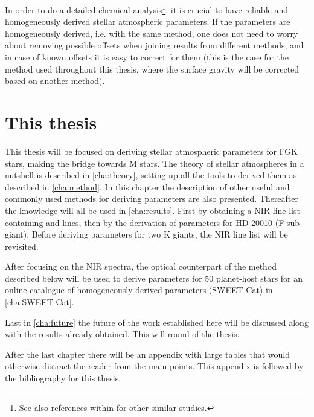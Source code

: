 In order to do a detailed chemical analysis\footnote{See also references within
\citet{Adibekyan2012} for other similar studies.}, it is crucial to have reliable and homogeneously
derived stellar atmospheric parameters. If the parameters are homogeneously derived, i.e. with the
same method, one does not need to worry about removing possible offsets when joining results from
different methods, and in case of known offsets it is easy to correct for them (this is the case for
the method used throughout this thesis, where the surface gravity will be corrected based on another
method).


\section{This thesis}
\label{sec:this_thesis}

This thesis will be focused on deriving stellar atmospheric parameters for FGK stars, making the
bridge towards M stars. The theory of stellar atmospheres in a nutshell is described in
\cref{cha:theory}, setting up all the tools to derived them as described in \cref{cha:method}. In
this chapter the description of other useful and commonly used methods for deriving parameters are
also presented. Thereafter the knowledge will all be used in \cref{cha:results}. First by obtaining
a NIR line list containing  and  lines, then by the derivation of parameters
for HD 20010 (F sub-giant). Before deriving parameters for two K giants, the NIR line list will be
revisited.

After focusing on the NIR spectra, the optical counterpart of the method described below will be
used to derive parameters for 50 planet-host stars for an online catalogue of homogeneously derived
parameters (SWEET-Cat) in \cref{cha:SWEET-Cat}.

Last in \cref{cha:future} the future of the work established here will be discussed along with the
results already obtained. This will round of the thesis.

After the last chapter there will be an appendix with large tables that would otherwise distract the
reader from the main points. This appendix is followed by the bibliography for this thesis.
